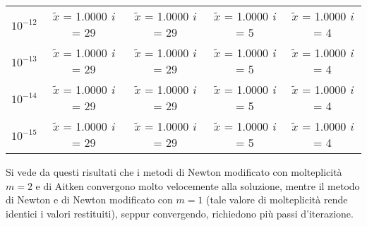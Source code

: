 \begin{center}
\begin{tabular}{|c|c|c|c|c|}
$10^{-12}$ & $\tilde{x}$ = 1.0000 \quad \textit{i} = 29 & $\tilde{x}$ = 1.0000 \quad \textit{i} = 29 & $\tilde{x}$ = 1.0000 \quad \textit{i} = 5 & $\tilde{x}$ = 1.0000 \quad \textit{i} = 4\\
$10^{-13}$ & $\tilde{x}$ = 1.0000 \quad \textit{i} = 29 & $\tilde{x}$ = 1.0000 \quad \textit{i} = 29 & $\tilde{x}$ = 1.0000 \quad \textit{i} = 5 & $\tilde{x}$ = 1.0000 \quad \textit{i} = 4\\
$10^{-14}$ & $\tilde{x}$ = 1.0000 \quad \textit{i} = 29 & $\tilde{x}$ = 1.0000 \quad \textit{i} = 29 & $\tilde{x}$ = 1.0000 \quad \textit{i} = 5 & $\tilde{x}$ = 1.0000 \quad \textit{i} = 4\\
$10^{-15}$ & $\tilde{x}$ = 1.0000 \quad \textit{i} = 29 & $\tilde{x}$ = 1.0000 \quad \textit{i} = 29 & $\tilde{x}$ = 1.0000 \quad \textit{i} = 5 & $\tilde{x}$ = 1.0000 \quad \textit{i} = 4\\
\hline
\end{tabular}
\end{center}
Si vede da questi risultati che i metodi di Newton modificato con molteplicità $m=2$ e di Aitken convergono molto velocemente alla soluzione, mentre il metodo di Newton e di Newton modificato con $m=1$ (tale valore di molteplicità rende identici i valori restituiti), seppur convergendo, richiedono più passi d'iterazione.
